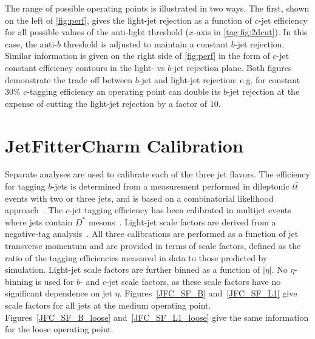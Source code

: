 The range of possible operating points is illustrated in two ways. The first, shown on the left of \cref{fig:perf}, gives the light-jet rejection as a function of $c$-jet efficiency for all possible values of the anti-light threshold ($x$-axis in \cref{tag:fig:2dcut}). In this case, the anti-$b$ threshold is adjusted to maintain a constant $b$-jet rejection. Similar information is given on the right side of \cref{fig:perf} in the form of $c$-jet constant efficiency contours in the light- vs $b$-jet rejection plane. Both figures demonstrate the trade off between $b$-jet and light-jet rejection: e.g. for constant 30\% $c$-tagging efficiency an operating point can double its $b$-jet rejection at the expense of cutting the light-jet rejection by a factor of 10.




\section{JetFitterCharm Calibration}
\label{sec:calib}
Separate analyses are used to calibrate each of the three jet flavors.
The efficiency for tagging $b$-jets is determined from a measurement performed in dileptonic $t\bar{t}$ events with two or three jets, and is based on a combinatorial likelihood approach~\cite{Giacinto}.
The $c$-jet tagging efficiency has been calibrated in multijet events where jets contain $D^*$ mesons~\cite{bc2014}.
Light-jet scale factors are derived from a negative-tag analysis~\cite{bc2014}.
All three calibrations are performed as a function of jet transverse momentum and are provided in terms of scale factors, defined as the ratio of the tagging efficiencies measured in data to those predicted by simulation.
Light-jet scale factors are further binned as a function of $|\eta|$. No $\eta$-binning is used for $b$- and $c$-jet scale factors, as these scale factors have no significant dependence on jet $\eta$.
Figures~\ref{JFC_SF_B} and~\ref{JFC_SF_L1} give scale factors for all jets at the medium operating point. Figures~\ref{JFC_SF_B_loose} and~\ref{JFC_SF_L1_loose} give the same information for the loose operating point.

\newcommand{\lSF}{as detailed in~\cite{bc2014}. The scale factors are measured relative to dijet Pythia8+EvtGen} %
\newcommand{\cSF}{as detailed in~\cite{bc2014}. The scale factors are measured relative to dijet Pythia8} %
\newcommand{\bSF}{as detailed in~\cite{Giacinto}. The scale factors are measured relative to $t \bar{t}$ Powheg+Pythia6} %
\newcommand{\bcSF}{The derivation of the $b$-tagging ($c$-tagging) scale factors, shown here relative to $t \bar{t}$ Powheg+Pythia6 (dijet Pythia8), is detailed in~\cite{Giacinto} (\hspace{1sp}\cite{bc2014})}

